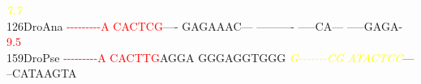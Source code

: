 \documentclass[11pt,twoside,reqno,a4paper]{article}
\begin{document}
{\hspace*{4\charwidth}\hspace*{7\charwidth}\hspace*{1\charwidth}\hspace*{1\charwidth}\hspace*{20\charwidth}\textit{\textcolor{yellow}{7.7}}\hspace*{1\charwidth}\hspace*{1\charwidth}\hspace*{1\charwidth}\hspace*{1\charwidth}\\
126\hspace*{1\charwidth}DroAna	\textcolor{red}{-}\textcolor{red}{-}\textcolor{red}{-}\textcolor{red}{-}\textcolor{red}{-}\textcolor{red}{-}\textcolor{red}{-}\textcolor{red}{-}\textcolor{red}{-}\textcolor{red}{A}	\textcolor{red}{C}\textcolor{red}{A}\textcolor{red}{C}\textcolor{red}{T}\textcolor{red}{C}\textcolor{red}{G}----	GAGAAAC---	----------	-----CA---	-----GAGA-	\\
\hspace*{4\charwidth}\hspace*{7\charwidth}\hspace*{0\charwidth}\textcolor{red}{9.5}\hspace*{1\charwidth}\hspace*{1\charwidth}\hspace*{1\charwidth}\hspace*{1\charwidth}\hspace*{1\charwidth}\hspace*{1\charwidth}\\
159\hspace*{1\charwidth}DroPse	\textcolor{red}{-}\textcolor{red}{-}\textcolor{red}{-}\textcolor{red}{-}\textcolor{red}{-}\textcolor{red}{-}\textcolor{red}{-}\textcolor{red}{-}\textcolor{red}{-}\textcolor{red}{A}	\textcolor{red}{C}\textcolor{red}{A}\textcolor{red}{C}\textcolor{red}{T}\textcolor{red}{T}\textcolor{red}{G}AGGA	GGGAGGTGGG	\textit{\textcolor{yellow}{G}}\textit{\textcolor{yellow}{-}}\textit{\textcolor{yellow}{-}}\textit{\textcolor{yellow}{-}}\textit{\textcolor{yellow}{-}}\textit{\textcolor{yellow}{-}}\textit{\textcolor{yellow}{-}}\textit{\textcolor{yellow}{-}}\textit{\textcolor{yellow}{C}}\textit{\textcolor{yellow}{G}}	\textit{\textcolor{yellow}{A}}\textit{\textcolor{yellow}{T}}\textit{\textcolor{yellow}{A}}\textit{\textcolor{yellow}{C}}\textit{\textcolor{yellow}{T}}\textit{\textcolor{yellow}{C}}\textit{\textcolor{yellow}{C}}---	--CATAAGTA	\\
}
\end{document}
